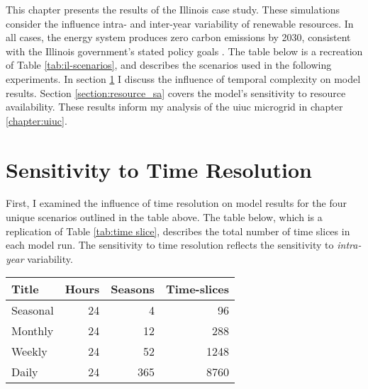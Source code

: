 This chapter presents the results of the Illinois case study. These simulations
consider the influence intra- and inter-year variability of renewable resources.
In all cases, the energy system produces zero carbon emissions by 2030,
consistent with the Illinois government's stated policy goals
\cite{harmon_climate_2021,office_of_governor_jb_pritzker_gov_2021}. The table
below is a recreation of Table \ref{tab:il-scenarios}, and describes the
scenarios used in the following experiments. In section \ref{section:time_res} I
discuss the influence of temporal complexity on model results. Section \ref{section:resource_sa}
covers the model's sensitivity to resource availability. These results inform
my analysis of the \gls{uiuc} microgrid in chapter \ref{chapter:uiuc}.

\begin{table}[H]
  \centering
\end{table}


\section{Sensitivity to Time Resolution}
\label{section:time_res}

First, I examined the influence of time resolution on model results for the four
unique scenarios outlined in the table above. The table below, which is a
replication of  Table \ref{tab:time slice}, describes the total number of time slices in each model run.
The sensitivity to time resolution reflects the sensitivity to \textit{intra-year}
variability.

\begin{table}[H]
  \centering
  \begin{tabular}{lrrr}
    \toprule
    Title & Hours & Seasons & Time-slices \\
    \midrule
    Seasonal & 24 & 4 & 96\\
    Monthly & 24 & 12 & 288\\
    Weekly & 24 & 52 & 1248\\
    Daily & 24 & 365 & 8760\\
    \bottomrule
  \end{tabular}
\end{table}


